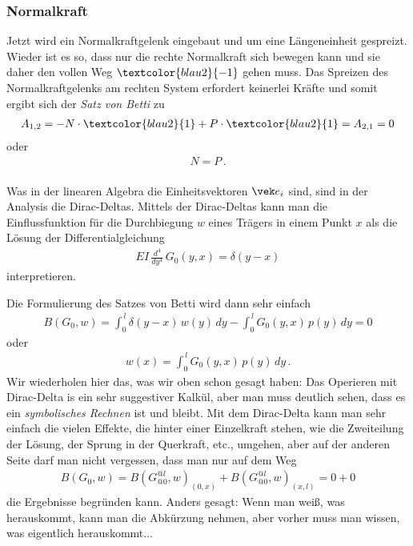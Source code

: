\subsubsection*{Normalkraft}
Jetzt wird ein Normalkraftgelenk eingebaut und um eine L\"{a}ngeneinheit gespreizt. Wieder ist es so, dass nur die rechte Normalkraft sich bewegen kann und sie daher den vollen Weg $\textcolor{blau2}{-1}$ gehen muss. Das Spreizen des Normalkraftgelenks am rechten System erfordert keinerlei Kr\"{a}fte und somit ergibt sich der {\em Satz von Betti\/} zu
\begin{align}
A_{1,2} = - N \cdot \textcolor{blau2}{1} + P\cdot \textcolor{blau2}{1} = A_{2,1} = 0
\end{align}
oder
\begin{align}
N = P\,.
\end{align}\\

Was in der linearen Algebra die Einheitsvektoren $\vek e_i$ sind, sind in der Ana\-lysis die Dirac-Deltas. Mittels der Dirac-Deltas kann man die Einflussfunktion f\"{u}r die Durchbiegung $w$ eines Tr\"{a}gers in einem Punkt $x$ als die L\"{o}sung der Differentialgleichung
\begin{align}
EI\,\frac{d^4}{dy^4}\,G_0(y,x) = \delta(y-x)
\end{align}
interpretieren.

Die Formulierung des Satzes von Betti wird dann sehr einfach
\begin{align}
B(G_0,w) = \int_0^{\,l} \delta(y-x)\,w(y)\,dy - \int_0^{\,l} G_0(y,x)\,p(y)\,dy = 0
\end{align}
oder
\begin{align}
w(x) = \int_0^{\,l} G_0(y,x)\,p(y)\,dy \,.
\end{align}
Wir wiederholen hier das, was wir oben schon gesagt haben: Das Operieren mit Dirac-Delta is ein sehr suggestiver Kalk\"{u}l, aber man muss deutlich sehen, dass es ein {\em symbolisches Rechnen\/} ist und bleibt. Mit dem Dirac-Delta kann man sehr einfach die vielen Effekte, die hinter einer Einzelkraft stehen, wie die Zweiteilung der L\"{o}sung, der Sprung in der Querkraft, etc., umgehen, aber auf der anderen Seite darf man nicht vergessen, dass man nur auf dem Weg
\begin{align}
B(G_0,w) = B(G_{@0}^{@l},w)_{(0,x)} + B(G_{@0}^{@l},w)_{(x,l)} = 0 + 0
\end{align}
die Ergebnisse begr\"{u}nden kann. Anders gesagt: Wenn man wei{\ss}, was herauskommt, kann man die Abk\"{u}rzung nehmen, aber vorher muss man wissen, was eigentlich herauskommt...
\\

